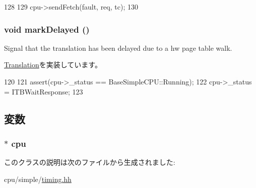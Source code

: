 \begin{DoxyCode}
128         {
129             cpu->sendFetch(fault, req, tc);
130         }
\end{DoxyCode}
\hypertarget{classTimingSimpleCPU_1_1FetchTranslation_ad1fd11d1e352cfc4b329d29b46a19fc4}{
\subsubsection[{markDelayed}]{\setlength{\rightskip}{0pt plus 5cm}void markDelayed ()}}
\label{classTimingSimpleCPU_1_1FetchTranslation_ad1fd11d1e352cfc4b329d29b46a19fc4}
Signal that the translation has been delayed due to a hw page table walk. 

\hyperlink{classBaseTLB_1_1Translation_ab88d5e1938190b55d7859d5cc4d10446}{Translation}を実装しています。


\begin{DoxyCode}
120         {
121             assert(cpu->_status == BaseSimpleCPU::Running);
122             cpu->_status = ITBWaitResponse;
123         }
\end{DoxyCode}


\subsection{変数}
\hypertarget{classTimingSimpleCPU_1_1FetchTranslation_ace3e131319475077fac2fa861708b0c9}{
\subsubsection[{cpu}]{$\ast$ {\bf cpu}}}
\label{classTimingSimpleCPU_1_1FetchTranslation_ace3e131319475077fac2fa861708b0c9}


このクラスの説明は次のファイルから生成されました:\begin{DoxyCompactItemize}
\item 
cpu/simple/\hyperlink{timing_8hh}{timing.hh}\end{DoxyCompactItemize}
